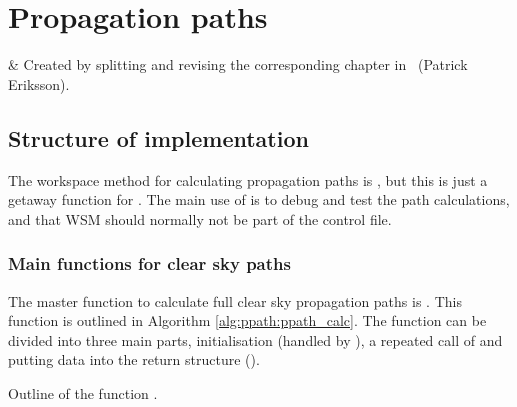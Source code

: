 \chapter{Propagation paths}
 \label{sec:ppaththeory}


  & Created by splitting and revising the corresponding chapter 
          in \user\ (Patrick Eriksson).\\
 \stophistory


\graphicspath{{Figs/ppath/}}



\section{Structure of implementation}
\label{sec:ppath:structure}

The workspace method for calculating propagation paths is
, but this is just a getaway function for
. The main use of  is to
debug and test the path calculations, and that WSM should normally not
be part of the control file. 


\subsection{Main functions for clear sky paths}

The master function to calculate full clear sky propagation paths is
. This function is outlined in
Algorithm \ref{alg:ppath:ppath_calc}. The function can be divided into
three main parts, initialisation (handled by
), a repeated call of
 and putting data into the return
structure ().

\begin{algorithm}
 \begin{algorithmic}
   \ENDIF
    \ENDIF
   \ENDIF
  \ENDWHILE
 \end{algorithmic}
 \caption{Outline of the function .}
 \label{alg:ppath:ppath_calc}
\end{algorithm}

